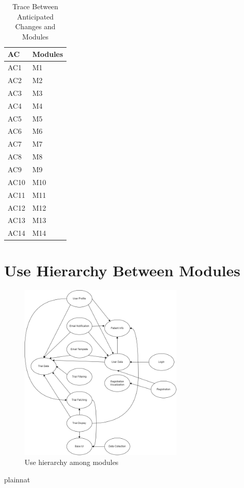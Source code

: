 \documentclass[12pt, titlepage]{article}
\begin{document}
\begin{table}[H]
\centering
\begin{tabular}{p{} p{}}
\toprule
\textbf{AC} & \textbf{Modules}\\
\midrule
AC1&M1\\
AC2&M2\\
AC3&M3\\
AC4&M4\\
AC5&M5\\
AC6&M6\\
AC7&M7\\ 
AC8&M8\\
AC9&M9\\
AC10&M10\\
AC11&M11\\
AC12&M12\\
AC13&M13\\
AC14&M14\\
\bottomrule
\end{tabular}
\caption{Trace Between Anticipated Changes and Modules}
\label{TblACT}
\end{table}

\section{Use Hierarchy Between Modules} \label{SecUse}

\begin{figure}[H]
\centering
\includegraphics[width=0.7\textwidth]{UsesHierarchy.png}
\caption{Use hierarchy among modules}
\label{FigUH}
\end{figure}


 {plainnat}


\newpage{}
\end{document}
